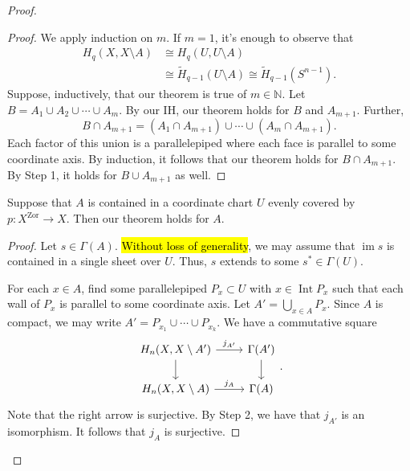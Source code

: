 \documentclass[10pt,letterpaper,cm]{nupset}
\theoremstyle{definition}
\theoremstyle{theorem}
\theoremstyle{remark}
\newcommand{\N}{\mathbb N}
\newcommand{\1}{\mathbb{1}}
\newcommand{\0}{\vec 0}
\DeclareMathOperator{\im}{im}
\DeclareMathOperator{\Int}{Int}
\begin{document}
\begin{proof}
\begin{steps}
\begin{proof}
We apply induction on $m$. If $m=1$, it's enough to observe that
\begin{align*}
H_q(X, X\setminus A) & \cong H_q(U, U\setminus A)
\\ &\cong  \widetilde{H}_{q-1}(U\setminus A) \cong \widetilde{H}_{q-1}(S^{n-1}).
\end{align*} Suppose, inductively, that our theorem is true of $m\in \N$. Let $B= A_1 \cup A_2 \cup \cdots \cup  A_m$. By our IH, our theorem holds for $B$ and $A_{m+1}$. Further, $$B \cap A_{m+1} = (A_1 \cap A_{m+1}) \cup \cdots \cup (A_m \cap A_{m+1}) .$$ Each factor of this union is a parallelepiped where each face is parallel to some coordinate axis. By induction, it follows that our theorem holds for $B \cap A_{m+1}$. By Step 1, it holds for $B \cup A_{m+1}$ as well.
\end{proof}
\item Suppose that $A$ is contained in a coordinate chart $U$ evenly covered by $p: X^{\mathrm{Zor}} \to X$. Then our theorem holds for $A$.
\begin{proof}
Let $s\in \Gamma(A)$. \hl{Without loss of generality}, we may assume that $\im{s}$ is contained in a single sheet over $U$. Thus, $s$ extends to some $s^{\ast} \in \Gamma(U)$.

For each $x\in A$, find some parallelepiped $P_x \subset U$ with $x\in \Int{P_x}$ such that each wall of $P_x$ is parallel to some coordinate axis. Let $A' = \bigcup_{x\in A}P_x$. Since $A$ is compact, we may write $A' = P_{x_1} \cup \cdots \cup P_{x_k}$. We have a commutative square
\[
\begin{tikzcd}
{H_n(X, X\setminus A')} \arrow[r, "j_{A'}"] \arrow[d] & \Gamma(A') \arrow[d] \\
{H_n(X, X\setminus A)} \arrow[r, "j_A"]               & \Gamma(A)           
\end{tikzcd}
.\] Note that the right arrow is surjective. By Step 2, we have that $j_{A'}$ is an isomorphism. It follows that $j_A$ is surjective.


\end{proof}
\end{steps}
\end{proof}
\end{document}
